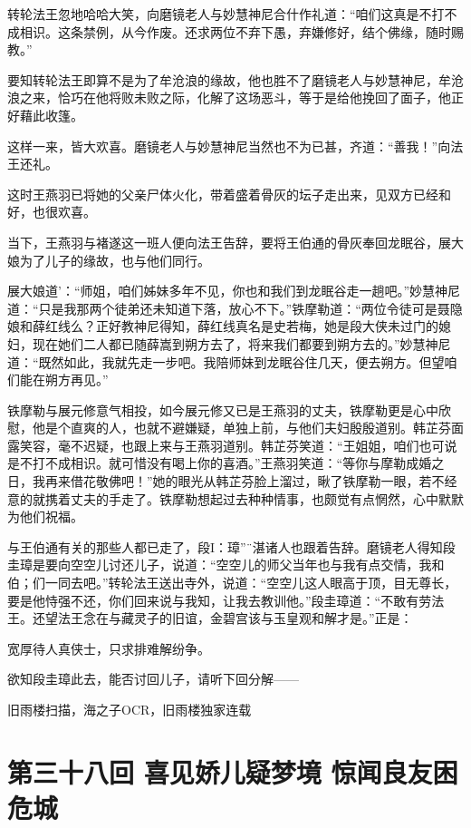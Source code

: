 \documentclass[12pt,oneside]{book}
\begin{document}
转轮法王忽地哈哈大笑，向磨镜老人与妙慧神尼合什作礼道：``咱们这真是不打不成相识。这条禁例，从今作废。还求两位不弃下愚，弃嫌修好，结个佛缘，随时赐教。''

要知转轮法王即算不是为了牟沧浪的缘故，他也胜不了磨镜老人与妙慧神尼，牟沧浪之来，恰巧在他将败未败之际，化解了这场恶斗，等于是给他挽回了面子，他正好藉此收篷。

这样一来，皆大欢喜。磨镜老人与妙慧神尼当然也不为已甚，齐道：``善我！''向法王还礼。

这时王燕羽已将她的父亲尸体火化，带着盛着骨灰的坛子走出来，见双方已经和好，也很欢喜。

当下，王燕羽与褚遂这一班人便向法王告辞，要将王伯通的骨灰奉回龙眠谷，展大娘为了儿子的缘故，也与他们同行。

展大娘道'：``师姐，咱们姊妹多年不见，你也和我们到龙眠谷走一趟吧。''妙慧神尼道：``只是我那两个徒弟还未知道下落，放心不下。''铁摩勒道：``两位令徒可是聂隐娘和薛红线么？正好教神尼得知，薛红线真名是史若梅，她是段大侠未过门的媳妇，现在她们二人都已随薛嵩到朔方去了，将来我们都要到朔方去的。''妙慧神尼道：``既然如此，我就先走一步吧。我陪师妹到龙眠谷住几天，便去朔方。但望咱们能在朔方再见。''

铁摩勒与展元修意气相投，如今展元修又已是王燕羽的丈夫，铁摩勒更是心中欣慰，他是个直爽的人，也就不避嫌疑，单独上前，与他们夫妇殷殷道别。韩芷芬面露笑容，毫不迟疑，也跟上来与王燕羽道别。韩芷芬笑道：``王姐姐，咱们也可说是不打不成相识。就可惜没有喝上你的喜酒。''王燕羽笑道：``等你与摩勒成婚之日，我再来借花敬佛吧！''她的眼光从韩芷芬脸上溜过，瞅了铁摩勒一眼，若不经意的就携着丈夫的手走了。铁摩勒想起过去种种情事，也颇觉有点惘然，心中默默为他们祝福。

与王伯通有关的那些人都已走了，段I：璋''¨湛诸人也跟着告辞。磨镜老人得知段圭璋是要向空空儿讨还儿子，说道：``空空儿的师父当年也与我有点交情，我和伯；们一同去吧。''转轮法王送出寺外，说道：``空空儿这人眼高于顶，目无尊长，要是他恃强不还，你们回来说与我知，让我去教训他。''段圭璋道：``不敢有劳法王。还望法王念在与藏灵子的旧谊，金碧宫该与玉皇观和解才是。''正是：

宽厚待人真侠士，只求排难解纷争。

欲知段圭璋此去，能否讨回儿子，请听下回分解------

旧雨楼扫描，海之子OCR，旧雨楼独家连载

\chapter{第三十八回 喜见娇儿疑梦境
惊闻良友困危城}\label{ux7b2cux4e09ux5341ux516bux56de-ux559cux89c1ux5a07ux513fux7591ux68a6ux5883-ux60caux95fbux826fux53cbux56f0ux5371ux57ce}
\end{document}
